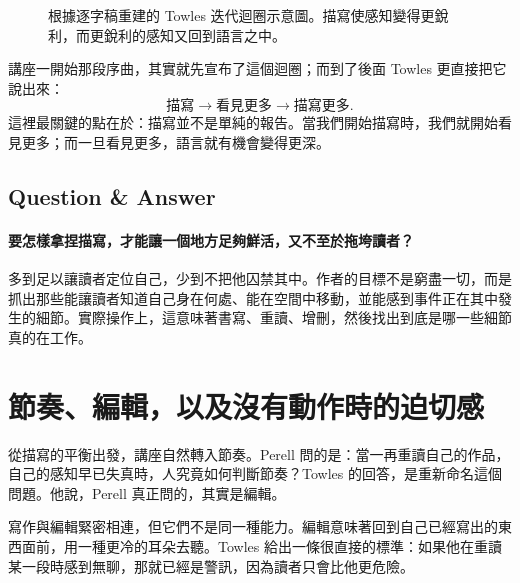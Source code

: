\begin{figure}[h]
\centering
{}
\caption{根據逐字稿重建的 Towles 迭代迴圈示意圖。描寫使感知變得更銳利，而更銳利的感知又回到語言之中。}
\end{figure}

講座一開始那段序曲，其實就先宣布了這個迴圈；而到了後面 Towles 更直接把它說出來：
\begin{equation}
\text{描寫} \longrightarrow \text{看見更多} \longrightarrow \text{描寫更多}.
\end{equation}
這裡最關鍵的點在於：描寫並不是單純的報告。當我們開始描寫時，我們就開始看見更多；而一旦看見更多，語言就有機會變得更深。

\subsection{Question \& Answer}

\paragraph{要怎樣拿捏描寫，才能讓一個地方足夠鮮活，又不至於拖垮讀者？}

多到足以讓讀者定位自己，少到不把他囚禁其中。作者的目標不是窮盡一切，而是抓出那些能讓讀者知道自己身在何處、能在空間中移動，並能感到事件正在其中發生的細節。實際操作上，這意味著書寫、重讀、增刪，然後找出到底是哪一些細節真的在工作。

\section{節奏、編輯，以及沒有動作時的迫切感}

從描寫的平衡出發，講座自然轉入節奏。Perell 問的是：當一再重讀自己的作品，自己的感知早已失真時，人究竟如何判斷節奏？Towles 的回答，是重新命名這個問題。他說，Perell 真正問的，其實是編輯。

寫作與編輯緊密相連，但它們不是同一種能力。編輯意味著回到自己已經寫出的東西面前，用一種更冷的耳朵去聽。Towles 給出一條很直接的標準：如果他在重讀某一段時感到無聊，那就已經是警訊，因為讀者只會比他更危險。

